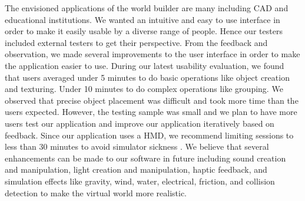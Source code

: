 The envisioned applications of the world builder are many including CAD and educational institutions.
We wanted an intuitive and easy to use interface in order to make it easily usable by a diverse range of people.
Hence our testers included external testers to get their perspective.
From the feedback and observation, we made several improvements to the user interface in order to make the application easier to use.
During our latest usability evaluation, we found that users averaged under 5 minutes to do basic operations like object creation and texturing.
Under 10 minutes to do complex operations like grouping.
We observed that precise object placement was difficult and took more time than the users expected.
However, the testing sample was small and we plan to have more users test our application and improve our application iteratively based on feedback.
Since our application uses a HMD, we recommend limiting sessions to less than 30 minutes to avoid simulator sickness \cite{Kaufmann:Usability}.
We believe that several enhancements can be made to our software in future including sound creation and manipulation, light creation and manipulation, haptic feedback, and simulation effects like gravity, wind, water, electrical, friction, and collision detection to make the virtual world more realistic.